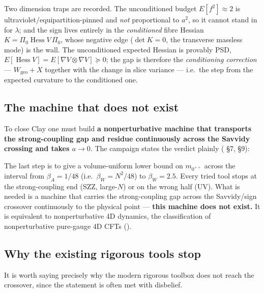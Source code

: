 Two dimension traps are recorded. The unconditioned budget $E[f^{2}]\approx2$ is
ultraviolet/equipartition-pinned and \emph{not} proportional to $a^{2}$, so it cannot stand in for
$\lambda$; and the sign lives entirely in the \emph{conditioned} fibre Hessian
$K=\Pi_0\operatorname{Hess}V\,\Pi_0$, whose negative edge ($\det K=0$, the transverse massless
mode) is the wall. The unconditioned expected Hessian is provably PSD,
$E[\operatorname{Hess}V]=E[\nabla V\otimes\nabla V]\succeq0$; the gap is therefore the
\emph{conditioning correction} --- $W_{\mathrm{geo}}+X$ together with the change in slice variance
--- i.e.\ the step from the expected curvature to the conditioned one.

\subsection{The machine that does not exist}

To close Clay one must build \textbf{a nonperturbative machine that transports the strong-coupling
gap and residue continuously across the Savvidy crossing and takes $a\to0$}. The campaign states
the verdict plainly ( \S7,  \S9):

\begin{qbox}
The last step is to give a volume-uniform lower bound on $m_{0^{++}}$ across the interval from $\beta_A=1/48$ (i.e.\ $\beta_W=N^2/48$) to $\beta_W=2.5$. Every
tried tool stops at the strong-coupling end (SZZ, large-$N$) or on the wrong half (UV). What is
needed is a machine that carries the strong-coupling gap across the Savvidy/sign crossover
continuously to the physical point --- \textbf{this machine does not exist.} It is equivalent to
nonperturbative 4D dynamics, the classification of nonperturbative pure-gauge 4D CFTs
().
\end{qbox}

\subsection{Why the existing rigorous tools stop}

It is worth saying precisely why the modern rigorous toolbox does not reach the crossover, since
the statement is often met with disbelief.

